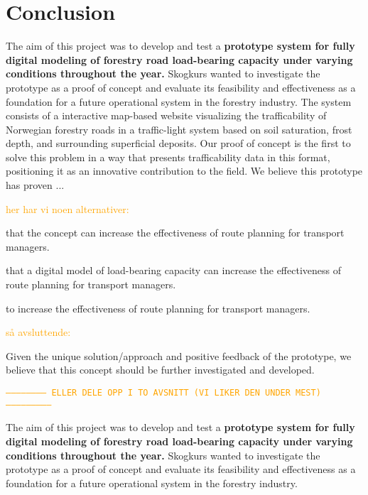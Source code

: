 \chapter{Conclusion}\label{chap:conclusion}

\begin{comment}
\textcolor{orange}{FRA PRESENTASJON OM KONKLUSJON:
    1. Gå tilbake til temaet
    2. Gjenoppgi hovedpåstanden eller gjenta problemstillingen
    3. Oppsummering av ideene som er diskutert
    4. Oppsummerende sluttpoeng:
        - Forsterke hovedbudskapet
        - Gi en tankevekker eller refleksjon
        - Peke på videre implikasjoner}    
\end{comment}

The aim of this project was to develop and test a \textbf{prototype system for fully digital modeling of forestry road load-bearing capacity under varying conditions throughout the year.} Skogkurs wanted to investigate the prototype as a proof of concept and evaluate its feasibility and effectiveness as a foundation for a future operational system in the forestry industry. The system consists of a interactive map-based website visualizing the trafficability of Norwegian forestry roads in a traffic-light system based on soil saturation, frost depth, and surrounding superficial deposits. Our proof of concept is the first to solve this problem in a way that presents trafficability data in this format, positioning it as an innovative contribution to the field. We believe this prototype has proven ... 

\textcolor{orange}{her har vi noen alternativer:}

that the concept can increase the effectiveness of route planning for transport managers.

that a digital model of load-bearing capacity can increase the effectiveness of route planning for transport managers.

to increase the effectiveness of route planning for transport managers.

\textcolor{orange}{så avsluttende:}

Given the unique solution/approach and positive feedback of the prototype, we believe that this concept should be further investigated and developed.


\textcolor{orange}{\texttt{------------------------ ELLER DELE OPP I TO AVSNITT (VI LIKER DEN UNDER MEST) ---------------------------}} 

The aim of this project was to develop and test a \textbf{prototype system for fully digital modeling of forestry road load-bearing capacity under varying conditions throughout the year.} Skogkurs wanted to investigate the prototype as a proof of concept and evaluate its feasibility and effectiveness as a foundation for a future operational system in the forestry industry. 

